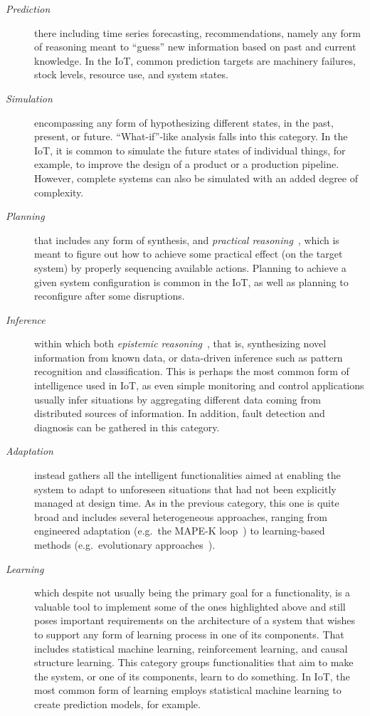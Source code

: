 \begin{description}
    \item[\emph{Prediction}] there including time series forecasting, recommendations, namely any form of reasoning meant to ``guess'' new information based on past and current knowledge. 
    In the IoT, common prediction targets are machinery failures, stock levels, resource use, and system states.


    \item[\emph{Simulation}] encompassing any form of hypothesizing different states, in the past, present, or future. 
    ``What-if''-like analysis falls into this category. 
    In the IoT, it is common to simulate the future states of individual things, for example, to improve the design of a product or a production pipeline. 
    However, complete systems can also be simulated with an added degree of complexity.


    \item[\emph{Planning}] that includes any form of synthesis, and \emph{practical reasoning}~\cite{Bratman1987-BRAIPA}, which is meant to figure out how to achieve some practical effect (on the target system) by properly sequencing available actions. 
    Planning to achieve a given system configuration is common in the IoT, as well as planning to reconfigure after some disruptions. 


    \item[\emph{Inference}] within which both \emph{epistemic reasoning}~\cite{Meyer1995}, that is, synthesizing novel information from known data, or data-driven inference such as pattern recognition and classification.
    This is perhaps the most common form of intelligence used in IoT, as even simple monitoring and control applications usually infer situations by aggregating different data coming from distributed sources of information. 
    In addition, fault detection and diagnosis can be gathered in this category. 


    \item[\emph{Adaptation}] instead gathers all the intelligent functionalities aimed at enabling the system to adapt to unforeseen situations that had not been explicitly managed at design time. 
    As in the previous category, this one is quite broad and includes several heterogeneous approaches, ranging from engineered adaptation (e.g.\ the MAPE-K loop~\cite{Kephart_Chess_2003}) to learning-based methods (e.g.\ evolutionary approaches~\cite{Eiben2005}). 


    \item[\emph{Learning}] which despite not usually being the primary goal for a functionality, is a valuable tool to implement some of the ones highlighted above and still poses important requirements on the architecture of a system that wishes to support any form of learning process in one of its components.
    That includes statistical machine learning, reinforcement learning, and causal structure learning. 
    This category groups functionalities that aim to make the system, or one of its components, learn to do something. 
    In IoT, the most common form of learning employs statistical machine learning to create prediction models, for example. 



\end{description}
